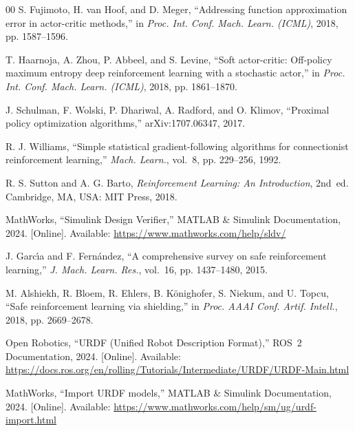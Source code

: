 \documentclass{ieeeaccess}
\begin{document}
\begin{thebibliography}{00}
S. Fujimoto, H. van Hoof, and D. Meger, ``Addressing function approximation error in actor-critic
methods,'' in \emph{Proc. Int. Conf. Mach. Learn. (ICML)}, 2018, pp. 1587--1596.



T. Haarnoja, A. Zhou, P. Abbeel, and S. Levine, ``Soft actor-critic: Off-policy maximum entropy
deep reinforcement learning with a stochastic actor,'' in \emph{Proc. Int. Conf. Mach. Learn. (ICML)},
2018, pp. 1861--1870.



J. Schulman, F. Wolski, P. Dhariwal, A. Radford, and O. Klimov, ``Proximal policy optimization
algorithms,'' arXiv:1707.06347, 2017.



R. J. Williams, ``Simple statistical gradient-following algorithms for connectionist reinforcement learning,'' \emph{Mach. Learn.}, vol.~8,
pp. 229--256, 1992.



R. S. Sutton and A. G. Barto, \emph{Reinforcement Learning: An Introduction}, 2nd~ed. Cambridge, MA,
USA: MIT Press, 2018.



MathWorks, ``Simulink Design Verifier,'' MATLAB \& Simulink Documentation, 2024. [Online]. Available: \url{https://www.mathworks.com/help/sldv/}



J. Garc{\'\i}a and F. Fern{\'a}ndez, ``A comprehensive survey on safe reinforcement learning,'' \emph{J. Mach. Learn. Res.},
vol.~16, pp. 1437--1480, 2015.



M. Alshiekh, R. Bloem, R. Ehlers, B. K{\"o}nighofer, S. Niekum, and U. Topcu, ``Safe
reinforcement learning via shielding,'' in \emph{Proc. AAAI Conf. Artif. Intell.}, 2018, pp. 2669--2678.



Open Robotics, ``URDF (Unified Robot Description Format),'' ROS~2 Documentation, 2024. [Online]. Available: \url{https://docs.ros.org/en/rolling/Tutorials/Intermediate/URDF/URDF-Main.html}



MathWorks, ``Import URDF models,'' MATLAB \& Simulink Documentation, 2024. [Online]. Available: \url{https://www.mathworks.com/help/sm/ug/urdf-import.html}




\end{thebibliography}
\end{document}
